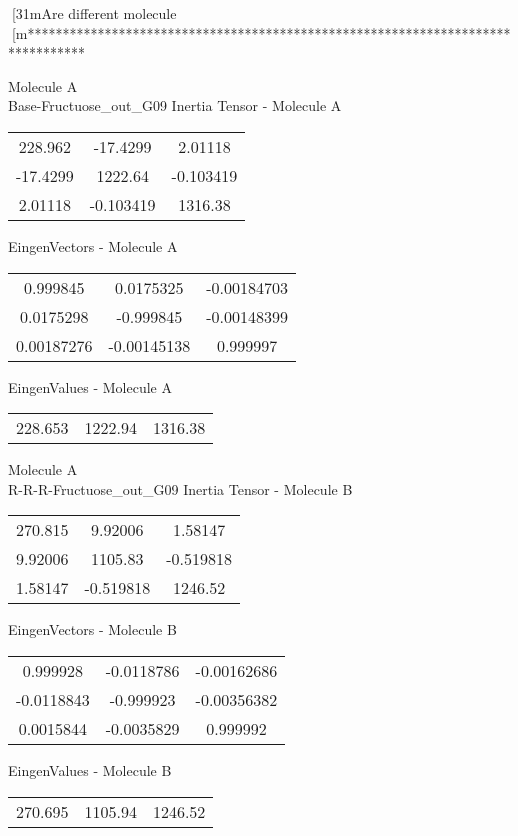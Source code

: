 [31mAre different molecule
[m********************************************************************************
\newpage
\begin{multicols}{2}
\begin{center}
Molecule A \\ 
Base-Fructuose_out_G09
Inertia Tensor - Molecule A \\
\vtab
\begin{tabular}{|c c c|}
228.962	 & 	-17.4299	 & 	2.01118	 \\
-17.4299	 & 	1222.64	 & 	-0.103419	 \\
2.01118	 & 	-0.103419	 & 	1316.38
\end{tabular}

\vtab
 EingenVectors - Molecule A     \\
\vtab
\begin{tabular}{|c c c|}
0.999845	 & 	0.0175325	 & 	-0.00184703	 \\
0.0175298	 & 	-0.999845	 & 	-0.00148399	 \\
0.00187276	 & 	-0.00145138	 & 	0.999997
\end{tabular}

\vtab
 EingenValues - Molecule A     \\
\vtab
\begin{tabular}{|c c c|}
228.653	 & 	1222.94	 & 	1316.38
\end{tabular}
\columnbreak
Molecule A \\ 
R-R-R-Fructuose_out_G09
Inertia Tensor - Molecule B \\
\vtab
\begin{tabular}{|c c c|}
270.815	 & 	9.92006	 & 	1.58147	 \\
9.92006	 & 	1105.83	 & 	-0.519818	 \\
1.58147	 & 	-0.519818	 & 	1246.52
\end{tabular}

\vtab
 EingenVectors - Molecule B     \\
\vtab
\begin{tabular}{|c c c|}
0.999928	 & 	-0.0118786	 & 	-0.00162686	 \\
-0.0118843	 & 	-0.999923	 & 	-0.00356382	 \\
0.0015844	 & 	-0.0035829	 & 	0.999992
\end{tabular}

\vtab
 EingenValues - Molecule B     \\
\vtab
\begin{tabular}{|c c c|}
270.695	 & 	1105.94	 & 	1246.52
\end{tabular}
\end{center}
\end{multicols}
